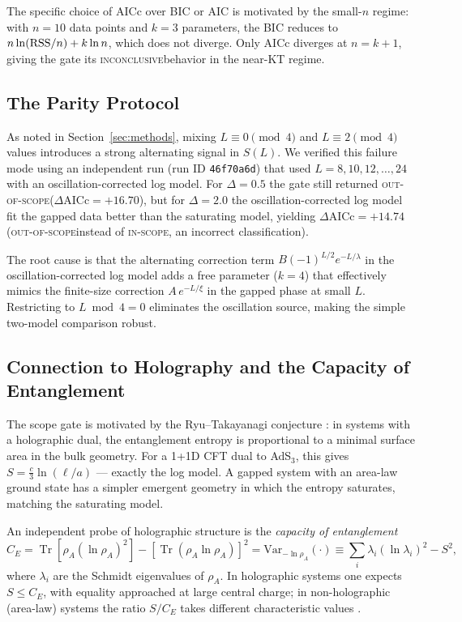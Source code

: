 \documentclass[11pt,letterpaper]{article}
\newcommand{\Tr}{\operatorname{Tr}}
\newcommand{\dAICc}{\Delta\mathrm{AICc}}
\newcommand{\CE}{C_{\!E}}
\newcommand{\inscope}{\textsc{in-scope}}
\newcommand{\outscope}{\textsc{out-of-scope}}
\newcommand{\inconclusive}{\textsc{inconclusive}}
\begin{document}
The specific choice of AICc over BIC or AIC is motivated by the small-$n$
regime: with $n = 10$ data points and $k = 3$ parameters, the BIC reduces
to $n\ln({\rm RSS}/n) + k\ln n$, which does not diverge.  Only AICc diverges
at $n = k+1$, giving the gate its \inconclusive behavior in the near-KT regime.

\subsection{The Parity Protocol}
\label{sec:parity}

As noted in Section~\ref{sec:methods}, mixing $L \equiv 0 \pmod 4$ and
$L \equiv 2 \pmod 4$ values introduces a strong alternating signal in
$S(L)$.  We verified this failure mode using an independent run
(run ID \texttt{46f70a6d}) that used $L = 8, 10, 12, \ldots, 24$ with an
oscillation-corrected log model.  For $\Delta = 0.5$ the gate still
returned \outscope ($\dAICc = +16.70$), but for $\Delta = 2.0$ the
oscillation-corrected log model fit the gapped data better than the
saturating model, yielding $\dAICc = +14.74$ (\outscope instead of
\inscope, an incorrect classification).

The root cause is that the alternating correction term
$B(-1)^{L/2}e^{-L/\lambda}$ in the oscillation-corrected log model adds a
free parameter ($k=4$) that effectively mimics the finite-size correction
$A\,e^{-L/\xi}$ in the gapped phase at small $L$.  Restricting to
$L \bmod 4 = 0$ eliminates the oscillation source, making the simple
two-model comparison robust.

\subsection{Connection to Holography and the Capacity of Entanglement}
\label{sec:holography}

The scope gate is motivated by the Ryu–Takayanagi conjecture
\cite{Ryu2006}: in systems with a holographic dual, the entanglement
entropy is proportional to a minimal surface area in the bulk geometry.
For a 1+1D CFT dual to AdS$_3$, this gives $S = \frac{c}{3}\ln(\ell/a)$
— exactly the log model.  A gapped system with an area-law ground state has
a simpler emergent geometry in which the entropy saturates, matching the
saturating model.

An independent probe of holographic structure is the \emph{capacity of
entanglement} \cite{deBoer2019}
\begin{equation}
  \CE = \Tr[\rho_A (\ln\rho_A)^2] - [\Tr(\rho_A\ln\rho_A)]^2
       = \mathrm{Var}_{-\ln\rho_A}(\cdot)
       \equiv \sum_i \lambda_i (\ln\lambda_i)^2 - S^2,
  \label{eq:ce}
\end{equation}
where $\lambda_i$ are the Schmidt eigenvalues of $\rho_A$.  In
holographic systems one expects $S \le \CE$, with equality approached at
large central charge; in non-holographic (area-law) systems the ratio
$S/\CE$ takes different characteristic values \cite{deBoer2019}.
\end{document}

